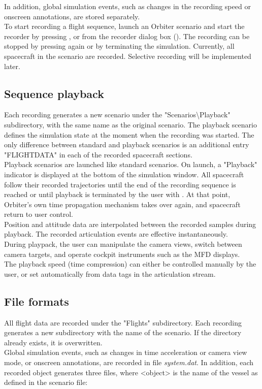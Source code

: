 \documentclass[Orbiter Technical Reference.tex]{subfiles}
\begin{document}
\noindent
In addition, global simulation events, such as changes in the recording speed or onscreen annotations, are stored separately.\\
To start recording a flight sequence, launch an Orbiter scenario and start the recorder by pressing \Ctrl{}, or from the recorder dialog box (\Ctrl{}). The recording can be stopped by pressing \Ctrl{} again or by terminating the simulation. Currently, all spacecraft in the scenario are recorded. Selective recording will be implemented later.


\subsection{Sequence playback}
Each recording generates a new scenario under the "Scenarios\textbackslash Playback" subdirectory, with the same name as the original scenario. The playback scenario defines the simulation state at the moment when the recording was started. The only difference between standard and playback scenarios is an additional entry "FLIGHTDATA" in each of the recorded spacecraft sections.\\
Playback scenarios are launched like standard scenarios. On launch, a "Playback" indicator is displayed at the bottom of the simulation window. All spacecraft follow their recorded trajectories until the end of the recording sequence is reached or until playback is terminated by the user with \Ctrl{}. At that point, Orbiter's own time propagation mechanism takes over again, and spacecraft return to user control.\\
Position and attitude data are interpolated between the recorded samples during playback. The recorded articulation events are effective instantaneously.\\
During playpack, the user can manipulate the camera views, switch between camera targets, and operate cockpit instruments such as the MFD displays.\\
The playback speed (time compression) can either be controlled manually by the user, or set automatically from data tags in the articulation stream.


\subsection{File formats}
All flight data are recorded under the "Flights" subdirectory. Each recording generates a new subdirectory with the name of the scenario. If the directory already exists, it is overwritten.\\
Global simulation events, such as changes in time acceleration or camera view mode, or onscreen annotations, are recorded in file \textit{system.dat}. In addition, each recorded object generates three files, where <object> is the name of the vessel as defined in the scenario file:
\end{document}
